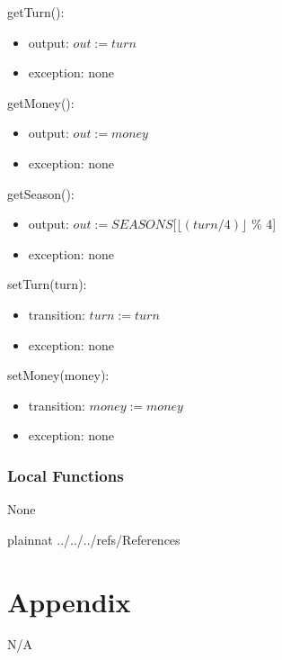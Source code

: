 \documentclass[12pt, titlepage]{article}
\begin{document}
\noindent getTurn():
\begin{itemize}
\item output: $out := turn$
\item exception: none
\end{itemize}

\noindent getMoney():
\begin{itemize}
\item output: $out := money$
\item exception: none
\end{itemize}

\noindent getSeason():
\begin{itemize}
\item output: $out := SEASONS[\lfloor(turn / 4)\rfloor$ \% 4]
\item exception: none
\end{itemize}

\noindent setTurn(turn):
\begin{itemize}
\item transition: $turn := turn$
\item exception: none
\end{itemize}

\noindent setMoney(money):
\begin{itemize}
\item transition: $money := money$
\item exception: none
\end{itemize}

\subsubsection{Local Functions}

None

\medskip

\newpage

 {plainnat}
 {../../../refs/References}

\newpage

\section{Appendix} \label{Appendix}
N/A
\end{document}
